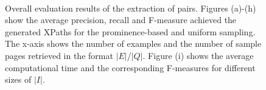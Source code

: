 \documentclass{llncs}
\begin{document}
\begin{figure}[h!tb]
        ~
        ~
\caption{Overall evaluation results of the extraction of pairs. Figures (a)-(h) show the average precision, recall and F-measure achieved the generated XPaths for the prominence-based and uniform sampling. The x-axis shows the number of examples and the number of sample pages retrieved in the format $|E|$/$|Q|$. Figure (i) shows the average computational time and the corresponding F-measures for different sizes of $|I|$.}
\label{fig:overall-XPaths}
\end{figure}
\end{document}
